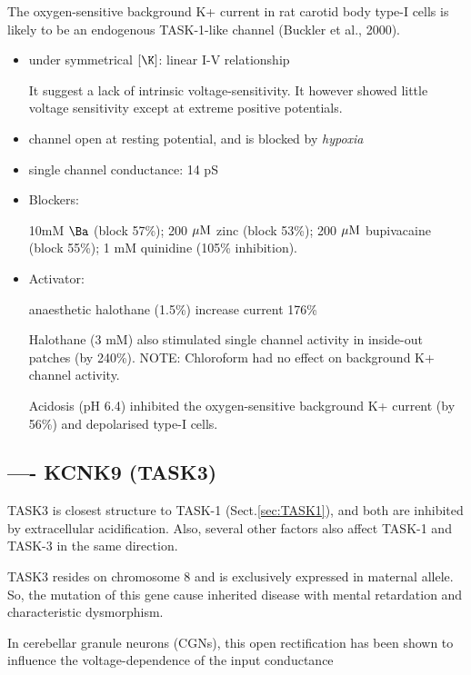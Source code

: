 The oxygen-sensitive background K+ current in rat carotid body type-I cells
is likely to be an endogenous TASK-1-like channel (Buckler et al., 2000).

\begin{itemize}
  \item under symmetrical $[\K]$: linear I-V relationship
  
It suggest a lack of intrinsic voltage-sensitivity.
It however showed little voltage sensitivity except at extreme positive
potentials.

  \item channel open at resting potential, and is blocked by {\it hypoxia}
  
  \item single channel conductance: 14 pS
  
  \item  Blockers:
  
  10mM $\Ba$ (block 57\%); 200 ${\mu\text{M}}$ zinc (block 53\%); 200 ${\mu\text{M}}$ bupivacaine 
  (block 55\%); 1 mM quinidine (105\% inhibition).
  
  
  \item Activator:
  
  anaesthetic halothane (1.5\%) increase current 176\%
  
  Halothane (3 mM) also stimulated single channel activity in inside-out patches
   (by 240\%). 
  NOTE: Chloroform had no effect on background K+ channel activity.
  
  Acidosis (pH 6.4) inhibited the oxygen-sensitive background K+ current (by
  56\%) and depolarised type-I cells.
  
\end{itemize}


\subsection{---- KCNK9 (TASK3)}
\label{sec:TASK3}
\label{sec:KCNK9}

TASK3 is closest structure to TASK-1 (Sect.\ref{sec:TASK1}), and both are
inhibited by extracellular acidification. Also, several other factors also
affect TASK-1 and TASK-3 in the same direction.

TASK3 resides on chromosome 8 and is exclusively expressed in maternal allele.
So, the mutation of this gene cause inherited disease with mental retardation
and characteristic dysmorphism.

 In cerebellar granule neurons (CGNs), this open rectification has
been shown to influence the voltage-dependence of the input conductance



